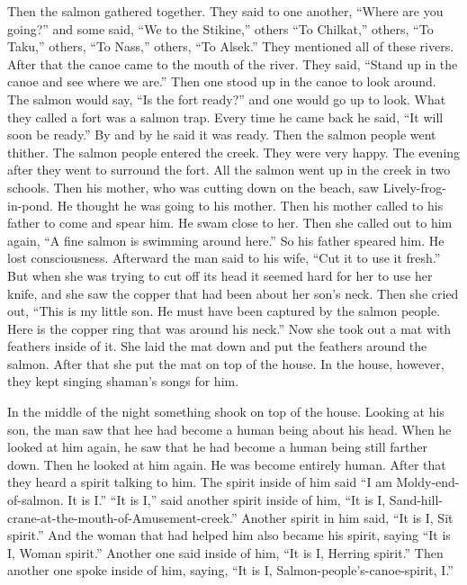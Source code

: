 Then the salmon gathered together.
They said to one another, \qqk{}“Where are you going?” and some said, “We to the Stikine,” others “To Chilkat,” others, “To Taku,” others, “To Nass,” others, “To Alsek.” They mentioned all of these rivers.
After that the canoe came to the mouth of the river.
They said, \qqk{}“Stand up in the canoe and see where we are.” Then one stood up in the canoe to look around.
The salmon would say, \qqk{}“Is the fort ready?” and one would go up to look.
What they called a fort was a salmon trap.
Every time he came back he said, \qqk{}“It will soon be ready.” By and by he said it was ready.
Then the salmon people went thither.
The salmon people entered the creek.
They were very happy.
The evening after they went to surround the fort.
All the salmon went up in the creek in two schools.
Then his mother, who was cutting down on the beach, saw Lively-frog-in-pond.
He thought he was going to his mother.
Then his mother called to his father to come and spear him.
He swam close to her.
Then she called out to him again, \qqk{}“A fine salmon is swimming around here.” So his father speared him.
He lost consciousness.
Afterward the man said to his wife, \qqk{}“Cut it to use it fresh.” But when she was trying to cut off its head it seemed hard for her to use her knife, and she saw the copper that had been about her son’s neck.
Then she cried out, \qqk{}“This is my little son.
He must have been captured by the salmon people.
Here is the copper ring that was around his neck.” Now she took out a mat with feathers inside of it.
She laid the mat down and put the feathers around the salmon.
After that she put the mat on top of the house.
In the house, however, they kept singing shaman’s songs for him.

In the middle of the night something shook on top of the house.
Looking at his son, the man saw that hee had become a human being about his head.
When he looked at him again, he saw that he had become a human being still farther down.
Then he looked at him again.
He was become entirely human.
After that they heard a spirit talking to him.
The spirit inside of him said \qqk{}“I am Moldy-end-of-salmon.
It is I.” \qqk{}“It is I,” said another spirit inside of him, \qqk{}“It is I, Sand-hill-crane-at-the-mouth-of-Amusement-creek.” Another spirit in him said, \qqk{}“It is I, Sīt spirit.” And the woman that had helped him also became his spirit, saying “It is I, Woman spirit.” Another one said inside of him, “It is I, Herring spirit.” Then another one spoke inside of him, saying, \qqk{}“It is I, Salmon-people’s-canoe-spirit, I.”

